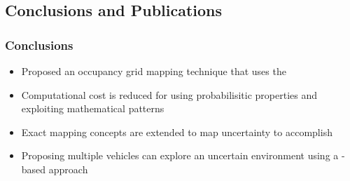 \documentclass[11pt,professionalfonts,hyperref={pdftex,pdfpagemode=none,pdfstartview=FitH}]{beamer}
\renewcommand{\emph}[1]{\textit{\textbf{\color{blue}{#1}}}}
\begin{document}
\begin{frame}
\frametitle{}
{}
\end{frame}


\subsection*{Conclusions and Publications}

\begin{frame}
\frametitle{Conclusions}
\begin{itemize}
        	\item Proposed an occupancy grid mapping technique that uses the \emph{exact probabilistic solution}
	\item Computational cost is reduced \emph{substantially} for \emph{real-time implementation} using probabilisitic properties and exploiting mathematical patterns
	\item Exact mapping concepts are extended to map uncertainty to accomplish \emph{autonomous exploration}
	\item Proposing multiple vehicles can explore an uncertain environment using a \emph{bidding}-based approach
\end{itemize}
\end{frame}
\end{document}
